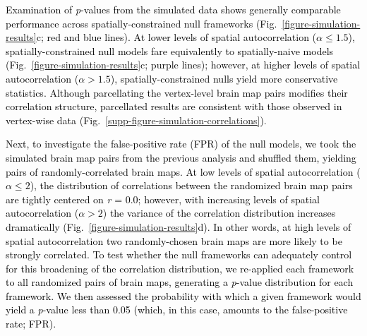 \documentclass[12pt,aps,pra,reprint,showkeys]{revtex4-1}
\newcommand{\nimg}[1]{\textcolor{black}{{#1}}}
\begin{document}
\nimg{Examination of \emph{p}-values from the simulated data shows generally comparable performance across spatially-constrained null frameworks (Fig.~\ref{figure-simulation-results}c; red and blue lines).
At lower levels of spatial autocorrelation ($\alpha \leq 1.5$), spatially-constrained null models fare equivalently to spatially-naive models (Fig.~\ref{figure-simulation-results}c; purple lines); however, at higher levels of spatial autocorrelation ($\alpha > 1.5$), spatially-constrained nulls yield more conservative statistics.
Although parcellating the vertex-level brain map pairs modifies their correlation structure, parcellated results are consistent with those observed in vertex-wise data (Fig.~\ref{supp-figure-simulation-correlations})}.

\nimg{Next, to investigate the false-positive rate (FPR) of the null models, we took the simulated brain map pairs from the previous analysis and shuffled them, yielding pairs of randomly-correlated brain maps.
At low levels of spatial autocorrelation ($\alpha \leq 2$), the distribution of correlations between the randomized brain map pairs are tightly centered on \emph{r} = 0.0; however, with increasing levels of spatial autocorrelation ($\alpha > 2$) the variance of the correlation distribution increases dramatically (Fig.~\ref{figure-simulation-results}d).
In other words, at high levels of spatial autocorrelation two randomly-chosen brain maps are more likely to be strongly correlated.
To test whether the null frameworks can adequately control for this broadening of the correlation distribution, we re-applied each framework to all randomized pairs of brain maps, generating a \emph{p}-value distribution for each framework.
We then assessed the probability with which a given framework would yield a \emph{p}-value less than 0.05 (which, in this case, amounts to the false-positive rate; FPR).}
\end{document}
